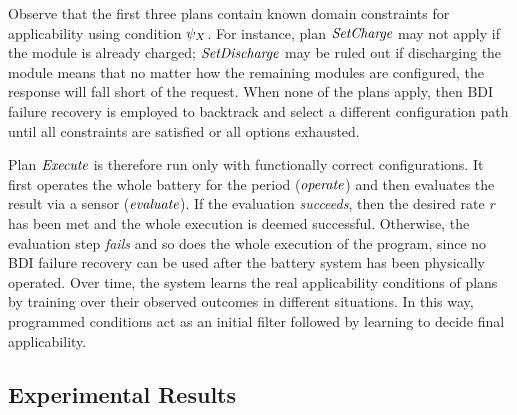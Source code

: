 Observe that the first three plans contain known domain constraints for applicability using condition $\psi_X$. For instance, plan $\operatorname{\textit{SetCharge}}$ may not apply if the module is already charged; $\operatorname{\textit{SetDischarge}}$ may be ruled out if discharging the module means that no matter how the remaining modules are configured, the response will fall short of the request. When none of the plans apply, then BDI failure recovery is employed to backtrack and select a different configuration path until all constraints are satisfied or all options exhausted. 

Plan $\operatorname{\textit{Execute}}$ is therefore run only with functionally correct configurations. It first operates the whole battery for the period ($\operatorname{\textit{operate}}$) and then evaluates the result via a sensor ($\operatorname{\textit{evaluate}}$). If the evaluation \emph{succeeds}, then the desired rate $r$ has been met and the whole execution is deemed successful. Otherwise, the evaluation step \emph{fails} and so does the whole execution of the program, since no BDI failure recovery can be used after the battery system has been physically operated. 
%
Over time, the system learns the real applicability conditions of plans by training over their observed outcomes in different situations. In this way, programmed conditions act as an initial filter followed by learning
to decide final applicability.

\subsection{Experimental Results}\label{sec:results}

